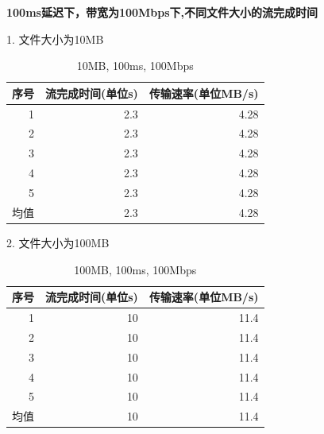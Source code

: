 \documentclass[11pt]{article}
\begin{document}
\textbf{100ms延迟下，带宽为100Mbps下,不同文件大小的流完成时间}

1. 文件大小为10MB

\begin{table}[htbp]
  \centering
  \caption{10MB, 100ms, 100Mbps}
    \begin{tabular}{|l|r|r|}
    \hline
    序号    & \multicolumn{1}{l|}{流完成时间(单位s)} & \multicolumn{1}{l|}{传输速率(单位MB/s)} \bigstrut\\
    \hline
    \multicolumn{1}{|r|}{1} & 2.3   & 4.28 \bigstrut\\
    \hline
    \multicolumn{1}{|r|}{2} & 2.3   & 4.28 \bigstrut\\
    \hline
    \multicolumn{1}{|r|}{3} & 2.3   & 4.28 \bigstrut\\
    \hline
    \multicolumn{1}{|r|}{4} & 2.3   & 4.28 \bigstrut\\
    \hline
    \multicolumn{1}{|r|}{5} & 2.3   & 4.28 \bigstrut\\
    \hline
    均值    & 2.3   & 4.28 \bigstrut\\
    \hline
    \end{tabular}%
  
\end{table}%

\newpage 

2. 文件大小为100MB

\begin{table}[htbp]
  \centering
  \caption{100MB, 100ms, 100Mbps}
    \begin{tabular}{|l|r|r|}
    \hline
    序号    & \multicolumn{1}{l|}{流完成时间(单位s)} & \multicolumn{1}{l|}{传输速率(单位MB/s)} \bigstrut\\
    \hline
    \multicolumn{1}{|r|}{1} & 10    & 11.4 \bigstrut\\
    \hline
    \multicolumn{1}{|r|}{2} & 10    & 11.4 \bigstrut\\
    \hline
    \multicolumn{1}{|r|}{3} & 10    & 11.4 \bigstrut\\
    \hline
    \multicolumn{1}{|r|}{4} & 10    & 11.4 \bigstrut\\
    \hline
    \multicolumn{1}{|r|}{5} & 10    & 11.4 \bigstrut\\
    \hline
    均值    & 10    & 11.4 \bigstrut\\
    \hline
    \end{tabular}%
  
\end{table}%
\end{document}
